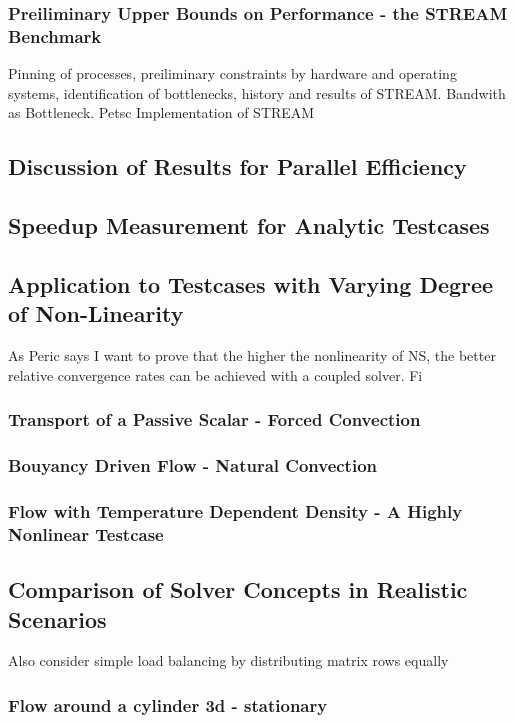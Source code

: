 \documentclass[article,type=msc,colorback,accentcolor=tud2a]{tudthesis}
\begin{document}
      \subsubsection{Preiliminary Upper Bounds on Performance - the STREAM Benchmark}
        Pinning of processes, preiliminary constraints by hardware and operating systems, identification of bottlenecks, history and results of STREAM. Bandwith as Bottleneck. Petsc Implementation of STREAM
      \subsection{Discussion of Results for Parallel Efficiency}
      \subsection{Speedup Measurement for Analytic Testcases}

    \subsection{Application to Testcases with Varying Degree of Non-Linearity}
      
      As Peric says I want to prove that the higher the nonlinearity of NS, the better relative convergence rates can be achieved with a coupled solver. Fi

      \subsubsection{Transport of a Passive Scalar - Forced Convection}
      \subsubsection{Bouyancy Driven Flow - Natural Convection}
      \subsubsection{Flow with Temperature Dependent Density - A Highly Nonlinear Testcase}

    \subsection{Comparison of Solver Concepts in Realistic Scenarios}
      Also consider simple load balancing by distributing matrix rows equally
      
      \subsubsection{Flow around a cylinder 3d - stationary}
\end{document}
